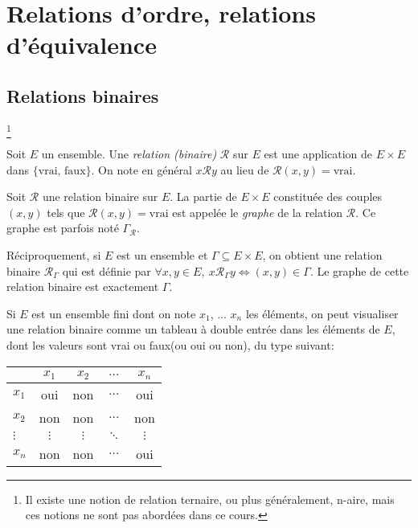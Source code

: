 \chapter{Relations d'ordre, relations d'équivalence}
\minitoc
\hyperlink{toc}{\retourTOC}


\section{Relations binaires}\footnote{Il existe une notion de relation ternaire, ou plus généralement, n-aire, mais ces notions ne sont pas abordées dans ce cours.}


\begin{definition}
Soit $E$ un ensemble. Une \emph{relation (binaire)} ${\mathcal R}$ sur $E$ est une application de $E\times E$ dans $\{\text{vrai, faux}\}$. On note en général \og$x{\mathcal R}y$\fg{} au lieu de \og${\mathcal R}(x,y)=\text{vrai}$\fg{}.
\end{definition}

\begin{definition}
Soit $\mathcal R$ une relation binaire sur $E$. La partie de $E\times E$ constituée des couples $(x,y)$ tels que ${\mathcal R}(x,y)=\text{vrai}$ est appelée le \emph{graphe} de la relation $\mathcal R$. Ce graphe est parfois noté $\Gamma_{\mathcal R}$.

Réciproquement, si $E$ est un ensemble et $\Gamma \subseteq E\times E$, on obtient une relation binaire ${\mathcal R}_\Gamma$ qui est définie par $\forall x, y\in E, \: x{\mathcal R}_\Gamma y \iff (x,y)\in \Gamma$. Le graphe de cette relation binaire est exactement $\Gamma$.
\end{definition}






Si $E$ est un ensemble fini dont on note $x_1$, ... $x_n$ les éléments, on peut visualiser une relation binaire comme un tableau à double entrée dans les éléments de $E$, dont les valeurs sont \og vrai\fg{} ou \og faux\fg (ou \og oui\fg{} ou \og non\fg), du type suivant:

\begin{center}
\begin{tabular}{|l|c|c|c|c|}\hline
		& $x_1$ & $x_2$ & $\dots$ & $x_n$ \\ \hline
$x_1$ 	& oui & non & $\dots$ & oui \\ \hline
$x_2$ 	& non & non & $\dots$ & non \\ \hline
$\vdots$& $\vdots$ & $\vdots$ &  $\ddots$ & $\vdots$ \\ \hline
$x_n$	& non & non & $\dots$ & oui \\ \hline
\end{tabular}
\end{center}

